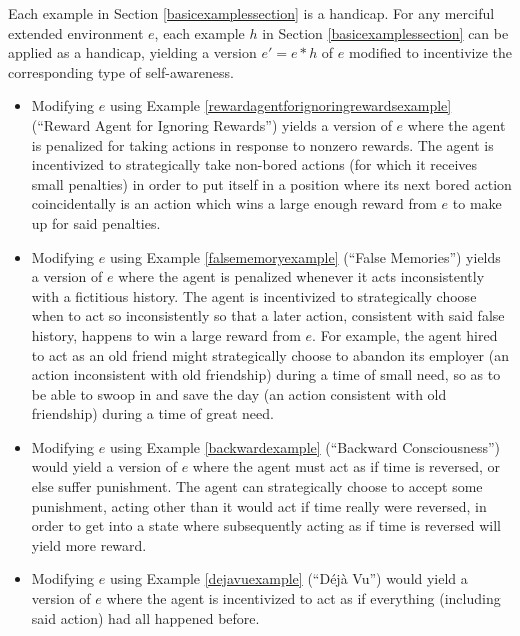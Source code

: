 \documentclass[runningheads]{llncs}
\begin{document}
\begin{example}
    Each example in Section \ref{basicexamplessection} is a handicap.
    For any merciful extended environment $e$, each example $h$ in
    Section \ref{basicexamplessection} can be applied as a handicap, yielding a
    version $e'=e*h$ of $e$ modified to incentivize the corresponding type of self-awareness.
    \begin{itemize}
        \item
        Modifying $e$ using Example \ref{rewardagentforignoringrewardsexample}
        (``Reward Agent for Ignoring Rewards'')
        yields a version of $e$ where the agent is penalized for taking actions in
        response to nonzero rewards. The agent is incentivized to strategically
        take non-bored actions (for which it receives small penalties) in order to
        put itself in a position where its next bored action coincidentally is an
        action which wins a large enough reward from $e$ to make up for said
        penalties.
        \item
        Modifying $e$ using Example \ref{falsememoryexample}
        (``False Memories'') yields a version of $e$ where the agent is penalized
        whenever it acts inconsistently with a fictitious history. The agent is
        incentivized to strategically choose when to act so inconsistently so that
        a later action, consistent with said false history, happens to win a large
        reward from $e$. For example, the agent hired to act as an old friend
        might strategically choose to abandon its employer (an action inconsistent
        with old friendship) during a time of small need, so as to be able to
        swoop in and save the day (an action consistent with old friendship)
        during a time of great need.
        \item
        Modifying $e$ using Example \ref{backwardexample}
        (``Backward Consciousness'') would yield a version of $e$
        where the agent must act as if time is reversed, or else suffer punishment.
        The agent can strategically choose to accept some punishment, acting other
        than it would act if time really were reversed, in order to get into a state
        where subsequently acting as if time is reversed will yield more reward.
        \item
        Modifying $e$ using Example \ref{dejavuexample} (``D\'{e}j\`{a} Vu'')
        would yield a version of $e$ where the agent is incentivized
        to act as if
        everything (including said action) had all happened before.

\end{itemize}
\end{example}
\end{document}
